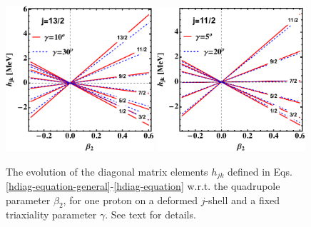 \begin{figure}
    \centering
    \includegraphics[width=0.49\textwidth]{Chapters/Figures/singleParticle-hdiag-1.pdf}
    \includegraphics[width=0.49\textwidth]{Chapters/Figures/singleParticle-hdiag-2.pdf}
    \caption{The evolution of the diagonal matrix elements $h_{jk}$ defined in Eqs. \ref{hdiag-equation-general}-\ref{hdiag-equation} w.r.t. the quadrupole parameter $\beta_2$, for one proton on a deformed $j$-shell and a fixed triaxiality parameter $\gamma$. See text for details.}
    \label{hdiag-beta-evolution}
\end{figure}
